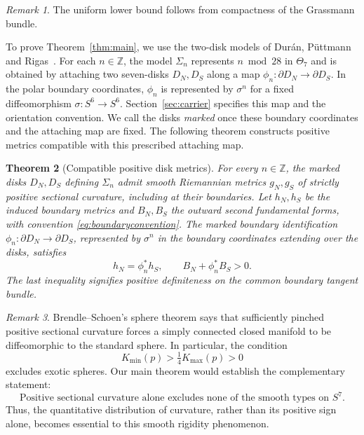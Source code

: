 \documentclass[12pt]{amsart}
\numberwithin{equation}{section}
\newtheorem{theorem}{Theorem}[section]
\theoremstyle{remark}
\newtheorem{remark}[theorem]{Remark}
\begin{document}
\begin{remark}
    The uniform lower bound follows from compactness of the Grassmann bundle.
\end{remark}

To prove Theorem~\ref{thm:main}, we use the two-disk models of
Dur\'an, P\"uttmann and Rigas~\cite{DPR}. For each \(n\in\mathbb Z\),
the model \(\Sigma_n\) represents \(n\bmod28\) in \(\Theta_7\)
and is obtained by attaching two seven-disks \(D_N,D_S\) along a
map \(\phi_n:\partial D_N\to\partial D_S\). In the polar boundary
coordinates, \(\phi_n\) is represented by \(\sigma^n\) for a fixed
diffeomorphism \(\sigma:S^6\to S^6\). Section~\ref{sec:carrier}
specifies this map and the orientation convention. We call the disks
\emph{marked} once these boundary coordinates and the attaching map
are fixed. The following theorem constructs positive metrics compatible
with this prescribed attaching map.

\begin{theorem}[Compatible positive disk metrics]\label{thm:fillings}
For every \(n\in\mathbb Z\), the marked disks \(D_N,D_S\) defining
\(\Sigma_n\) admit smooth Riemannian metrics \(g_N,g_S\) of strictly
positive sectional curvature, including at their boundaries.
Let \(h_N,h_S\) be the induced boundary metrics and \(B_N,B_S\)
the outward second fundamental forms, with convention
\eqref{eq:boundaryconvention}. The marked boundary identification
\(\phi_n:\partial D_N\to\partial D_S\), represented by \(\sigma^n\)
in the boundary coordinates extending over the disks, satisfies
\[
 h_N=\phi_n^*h_S,
 \qquad B_N+\phi_n^*B_S>0.
\]
The last inequality signifies positive definiteness on the common boundary
tangent bundle.
\end{theorem}

\begin{remark}
Brendle–Schoen’s sphere theorem says that sufficiently pinched positive sectional curvature forces a simply connected closed manifold to be diffeomorphic to the standard sphere. In particular, the condition
\[
K_{\min}(p)>\tfrac14K_{\max}(p)>0
\]excludes exotic spheres. Our main theorem would establish the complementary statement:
\[
\boxed{\text{Positive sectional curvature alone excludes none of the smooth types on }S^7.}
\]Thus, the quantitative distribution of curvature, rather than its positive sign alone, becomes essential to this smooth rigidity phenomenon.
\end{remark}
\end{document}
